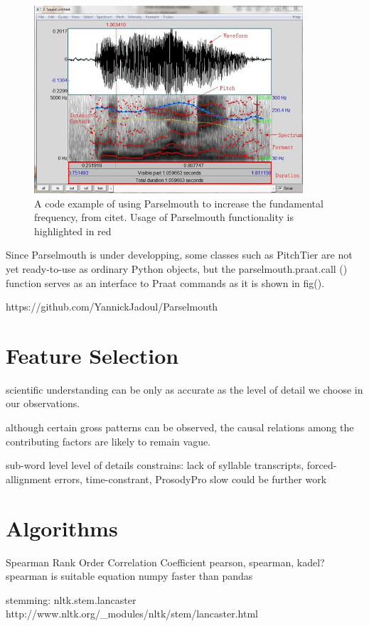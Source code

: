 \begin{figure}[ht]
	\center
	\includegraphics[width=10cm, scale=0.7]{figures/Praat.jpg}
	\caption{A code example of using Parselmouth to increase the fundamental frequency, from citet. Usage of Parselmouth functionality is highlighted in red}
	\label{fig:Parselmouth}
\end{figure}

Since Parselmouth is under developping, some classes such as PitchTier are not yet ready-to-use as ordinary Python objects, but the parselmouth.praat.call () function serves as an interface to Praat commands as it is shown in fig().

https://github.com/YannickJadoul/Parselmouth

\section{Feature Selection}
scientific understanding can be only as accurate as the level of detail we choose in our observations.

although certain gross patterns can be observed, the causal relations among the contributing factors are likely to remain vague. 

sub-word level 
level of details
constrains: lack of syllable transcripts, forced-allignment errors, time-constrant, ProsodyPro slow
could be further work 

\section{Algorithms}
Spearman Rank Order Correlation Coefficient
pearson, spearman, kadel?
spearman is suitable
equation
numpy faster than pandas

stemming: nltk.stem.lancaster
http://www.nltk.org/_modules/nltk/stem/lancaster.html

